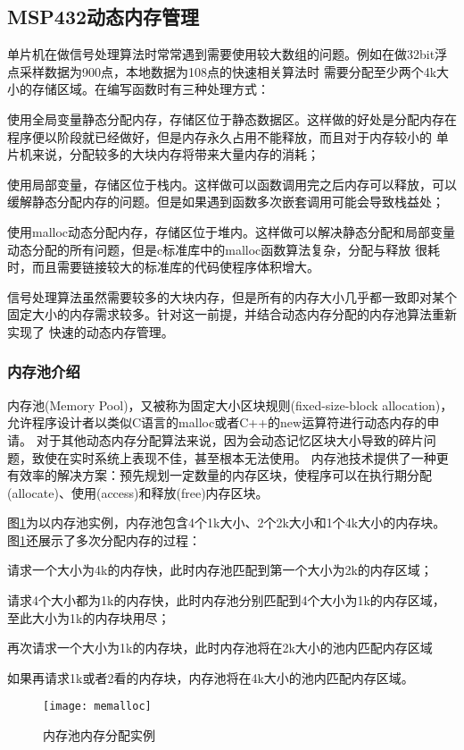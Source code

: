 \subsection{MSP432动态内存管理}
	单片机在做信号处理算法时常常遇到需要使用较大数组的问题。例如在做32bit浮点采样数据为900点，本地数据为108点的快速相关算法时
需要分配至少两个4k大小的存储区域。在编写函数时有三种处理方式：

\begin{publist}
	\item 使用全局变量静态分配内存，存储区位于静态数据区。这样做的好处是分配内存在程序便以阶段就已经做好，但是内存永久占用不能释放，而且对于内存较小的
	单片机来说，分配较多的大块内存将带来大量内存的消耗；
	\item 使用局部变量，存储区位于栈内。这样做可以函数调用完之后内存可以释放，可以缓解静态分配内存的问题。但是如果遇到函数多次嵌套调用可能会导致栈益处；
	\item 使用malloc动态分配内存，存储区位于堆内。这样做可以解决静态分配和局部变量动态分配的所有问题，但是c标准库中的malloc函数算法复杂，分配与释放
	很耗时，而且需要链接较大的标准库的代码使程序体积增大。
\end{publist}

	信号处理算法虽然需要较多的大块内存，但是所有的内存大小几乎都一致即对某个固定大小的内存需求较多。针对这一前提，并结合动态内存分配的内存池算法重新实现了
快速的动态内存管理。


\subsubsection{内存池介绍}
	内存池(Memory Pool)，又被称为固定大小区块规则(fixed-size-block allocation)，允许程序设计者以类似C语言的malloc或者C++的new运算符进行动态内存的申请。
对于其他动态内存分配算法来说，因为会动态记忆区块大小导致的碎片问题，致使在实时系统上表现不佳，甚至根本无法使用。
内存池技术提供了一种更有效率的解决方案：预先规划一定数量的内存区块，使程序可以在执行期分配(allocate)、使用(access)和释放(free)内存区块。
	
	图\ref{Figure:Software:memalloc}为以内存池实例，内存池包含4个1k大小、2个2k大小和1个4k大小的内存块。图\ref{Figure:Software:memalloc}还展示了多次分配内存的过程：
	
\begin{publist}
	\item 请求一个大小为4k的内存快，此时内存池匹配到第一个大小为2k的内存区域；
	\item 请求4个大小都为1k的内存快，此时内存池分别匹配到4个大小为1k的内存区域，至此大小为1k的内存块用尽；
	\item 再次请求一个大小为1k的内存块，此时内存池将在2k大小的池内匹配内存区域
	\item 如果再请求1k或者2看的内存块，内存池将在4k大小的池内匹配内存区域。
\end{publist}
	\begin{figure}[htbp]
		\centering
		\texttt{[image: memalloc]}
		\caption{内存池内存分配实例}
		\label{Figure:Software:memalloc}
	\end{figure}

